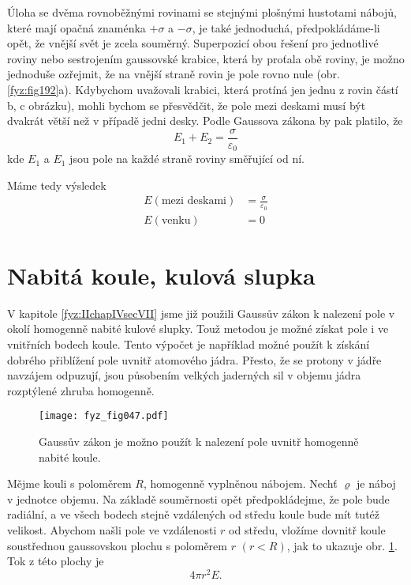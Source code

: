{  Úloha se dvěma rovnoběžnými rovinami se stejnými plošnými hustotami nábojů, které mají opačná 
  znaménka \(+\sigma\) a \(-\sigma\), je také jednoduchá, předpokládáme-li opět, že vnější svět 
  je zcela souměrný. Superpozicí obou řešení pro jednotlivé roviny nebo sestrojením gaussovské 
  krabice, která by proťala obě roviny, je možno jednoduše ozřejmit, že na vnější straně rovin 
  je pole rovno nule (obr. \ref{fyz:fig192}a). Kdybychom uvažovali krabici, 
  která protíná jen jednu z rovin částí b, c obrázku), mohli bychom se přesvědčit, že pole mezi 
  deskami musí být dvakrát větší než v případě jedni desky. Podle Gaussova zákona by pak 
  platilo, že
  \begin{equation}\label{fyz:eq_fey_elstat_gauss04}
    E_1 + E_2 = \frac{\sigma}{\varepsilon_0}
  \end{equation}
  kde \(E_1\) a \(E_1\) jsou pole na každé straně roviny směřující od ní.

  Máme tedy výsledek
  \begin{align}
    E (\text{mezi deskami}) &= \frac{\sigma}{\varepsilon_0} \\
    E (\text{venku})        &= 0  
  \end{align}
  
\section{Nabitá koule, kulová slupka}\label{fyz:IIchapVsecVI}
  V kapitole \ref{fyz:IIchapIVsecVII} jsme již použili Gaussův zákon k nalezení pole v okolí 
  homogenně nabité kulové slupky. Touž metodou je možné získat pole i ve vnitřních bodech 
  koule. Tento výpočet je například možné použít k získání dobrého přiblížení pole uvnitř 
  atomového jádra. Přesto, že se protony v jádře navzájem odpuzují, jsou působením velkých 
  jaderných sil v objemu jádra rozptýlené zhruba homogenně.

  \begin{figure}[ht!]  %
    \centering
    \texttt{[image: fyz\_fig047.pdf]}
    \caption{Gaussův zákon je možno použít k nalezení pole uvnitř homogenně nabité koule.}
    \label{fyz:fig047}
  \end{figure}
  Mějme kouli s poloměrem \(R\), homogenně vyplněnou nábojem. Nechť \(\varrho\) je náboj v 
  jednotce objemu. Na základě souměrnosti opět předpokládejme, že pole bude radiální, a ve 
  všech bodech stejně vzdálených od středu koule bude mít tutéž velikost. Abychom našli pole ve 
  vzdálenosti \(r\) od středu, vložíme dovnitř koule soustřednou gaussovskou plochu s poloměrem 
  \(r\) \((r< R)\), jak to ukazuje obr. \ref{fyz:fig047}. Tok z této plochy je 
  \[4\pi r^2E.\]

}
